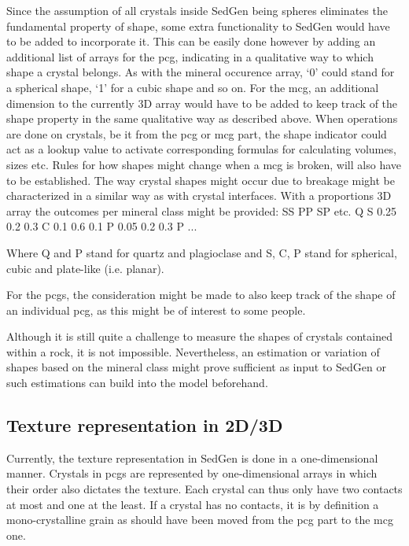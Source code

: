     Since the assumption of all crystals inside SedGen being spheres eliminates the fundamental property of shape, some extra functionality to SedGen would have to be added to incorporate it. %
    This can be easily done however by adding an additional list of arrays for the pcg, indicating in a qualitative way to which shape a crystal belongs. %
    As with the mineral occurence array, `0' could stand for a spherical shape, `1' for a cubic shape and so on. %
    For the mcg, an additional dimension to the currently 3D array would have to be added to keep track of the shape property in the same qualitative way as described above. %
    When operations are done on crystals, be it from the pcg or mcg part, the shape indicator could act as a lookup value to activate corresponding formulas for calculating volumes, sizes etc. %
    Rules for how shapes might change when a mcg is broken, will also have to be established. %
    The way crystal shapes might occur due to breakage might be characterized in a similar way as with crystal interfaces. %
    With a proportions 3D array the outcomes per mineral class might be provided:
            SS    PP    SP    etc.
    Q   S   0.25  0.2   0.3
        C   0.1   0.6   0.1
        P   0.05  0.2   0.3
    P   ...

    Where Q and P stand for quartz and plagioclase and S, C, P stand for spherical, cubic and plate-like (i.e. planar). %

    For the pcgs, the consideration might be made to also keep track of the shape of an individual pcg, as this might be of interest to some people. %

    Although it is still quite a challenge to measure the shapes of crystals contained within a rock, it is not impossible. %
    Nevertheless, an estimation or variation of shapes based on the mineral class might prove sufficient as input to SedGen or such estimations can build into the model beforehand. %

    \subsection{Texture representation in 2D/3D}
    Currently, the texture representation in SedGen is done in a one-dimensional manner. %
    Crystals in pcgs are represented by one-dimensional arrays in which their order also dictates the texture. %
    Each crystal can thus only have two contacts at most and one at the least. %
    If a crystal has no contacts, it is by definition a mono-crystalline grain as should have been moved from the pcg part to the mcg one. %


